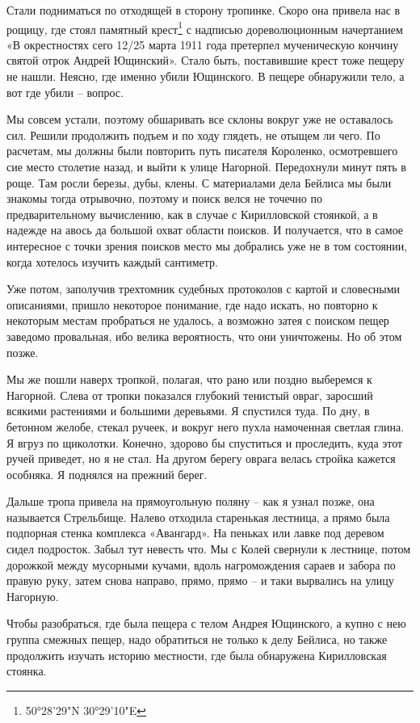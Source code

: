 Стали подниматься по отходящей в сторону тропинке. Скоро она привела нас в рощицу, где стоял памятный крест\footnote{50°28'29"N 30°29'10"E} с надписью  дореволюционным начертанием «В окрестностях сего 12/25 марта 1911 года претерпел мученическую кончину святой отрок Андрей Ющинский». Стало быть, поставившие крест тоже  пещеру не нашли. Неясно, где именно убили Ющинского. В пещере обнаружили тело, а вот где убили – вопрос.

Мы совсем устали, поэтому обшаривать все склоны вокруг уже не оставалось сил. Решили продолжить подъем и по ходу глядеть, не отыщем ли чего. По расчетам, мы должны были повторить путь писателя Короленко, осмотревшего сие место столетие назад, и выйти к улице Нагорной. Передохнули минут пять в роще. Там росли березы, дубы, клены. С материалами дела Бейлиса мы были знакомы тогда отрывочно, поэтому и поиск велся не точечно по предварительному вычислению, как в случае с Кирилловской стоянкой, а в надежде на авось да большой охват области поисков. И получается, что в самое интересное с точки зрения поисков место мы добрались уже не в том состоянии, когда хотелось изучить каждый сантиметр.

Уже потом, заполучив трехтомник судебных протоколов с картой и словесными описаниями, пришло некоторое понимание, где надо искать, но повторно к некоторым местам пробраться не удалось, а возможно затея с поиском пещер заведомо провальная, ибо велика вероятность, что они уничтожены. Но об этом позже.

Мы же пошли наверх тропкой, полагая, что рано или поздно выберемся к Нагорной. Слева от тропки показался глубокий тенистый овраг, заросший всякими растениями и большими деревьями. Я спустился туда. По дну, в бетонном желобе, стекал ручеек, и вокруг него пухла намоченная светлая глина. Я вгруз по щиколотки. Конечно, здорово бы спуститься и проследить, куда этот ручей приведет, но я не стал. На другом берегу оврага велась стройка кажется особняка. Я поднялся на прежний берег.

Дальше тропа привела на прямоугольную поляну – как я узнал позже, она называется Стрельбище. Налево отходила старенькая лестница, а прямо была подпорная стенка комплекса «Авангард». На пеньках или лавке под деревом сидел подросток. Забыл тут невесть что. Мы с Колей свернули к лестнице, потом дорожкой между мусорными кучами, вдоль нагромождения сараев и забора по правую руку, затем снова направо, прямо, прямо – и таки вырвались на улицу Нагорную.

Чтобы разобраться, где была пещера с телом Андрея Ющинского, а купно с нею группа смежных пещер, надо обратиться не только к делу Бейлиса, но также продолжить изучать историю местности, где была обнаружена Кирилловская стоянка.

